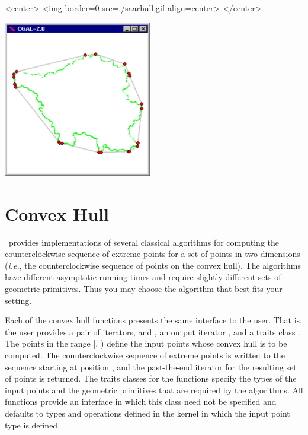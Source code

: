 \begin{ccHtmlOnly}
<center>
<img border=0 src=./saarhull.gif align=center>
</center>
\end{ccHtmlOnly} 

\begin{ccTexOnly}
\begin{center}
\includegraphics[width=6.5cm]{Convex_hull_2/saarhull}
\end{center}
\end{ccTexOnly}

\section{Convex Hull}
\label{sec:convex_hull_2}
\cgal\ provides implementations of several classical algorithms for
computing the counterclockwise sequence of extreme points for a set of 
points in two dimensions (\textit{i.e.}, the counterclockwise sequence 
of points on the convex hull).  The algorithms have different asymptotic
running times and require slightly different sets of geometric primitives. 
Thus you may choose the algorithm that best fits your setting.

Each of the convex hull functions presents the same interface to the
user.  That is, the user provides a pair of iterators, 
and , an output iterator ,  and a traits class
. The points in the range [, ) define
the input points whose convex hull is to be computed.  The counterclockwise
sequence of extreme points is written to the sequence starting at position
, and the past-the-end iterator for the resulting set of
points is returned.  The traits classes for the functions specify the types
of the input points and the geometric primitives that are required by
the algorithms. All functions provide an interface in which this
class need not be specified and defaults to types and operations defined
in the kernel in which the input point type is defined.

